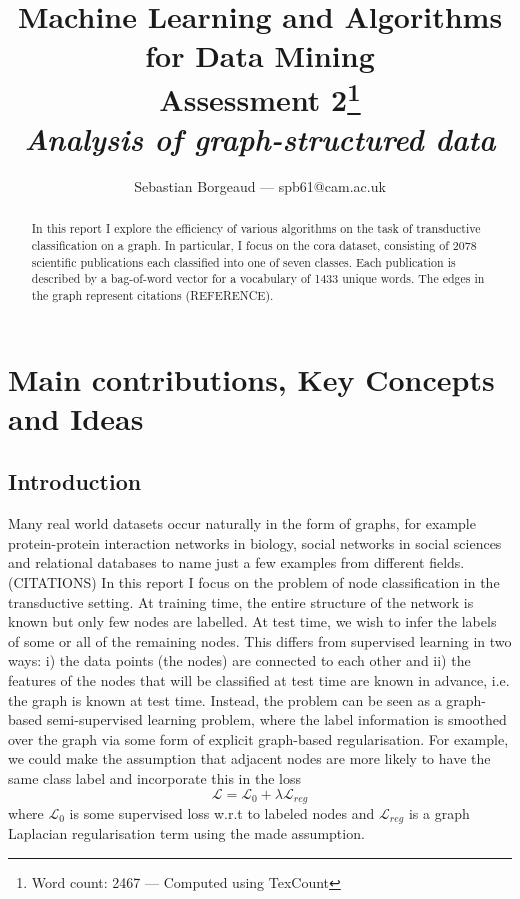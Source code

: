 \documentclass[12pt]{article}
\title{{\small{Machine Learning and Algorithms for Data Mining} \\
Assessment 2\footnote{Word count: 2467 --- Computed using TexCount}} \\
\textit{Analysis of graph-structured data}}
\author{Sebastian Borgeaud --- spb61@cam.ac.uk}
\theoremstyle{definition}
\begin{document}
\maketitle

\begin{abstract}
	In this report I explore the efficiency of various algorithms on the task of transductive classification on a graph. In particular, I focus on the cora dataset, consisting of 2078 scientific publications each classified into one of seven classes. Each publication is described by a bag-of-word vector for a vocabulary of 1433 unique words. The edges in the graph represent citations (REFERENCE).
	\end{abstract}

\section{Main contributions, Key Concepts and Ideas}
\subsection{Introduction}
Many real world datasets occur naturally in the form of graphs, for example protein-protein interaction networks in biology, social networks in social sciences and relational databases to name just a few examples from different fields. (CITATIONS) In this report I focus on the problem of node classification in the transductive setting. At training time, the entire structure of the network is known but only few nodes are labelled. At test time, we wish to infer the labels of some or all of the remaining nodes. This differs from supervised learning in two ways: i) the data points (the nodes) are connected to each other and ii) the features of the nodes that will be classified at test time are known in advance, i.e. the graph is known at test time. 
Instead, the problem can be seen as a graph-based semi-supervised learning problem, where the label information is smoothed over the graph via some form of explicit graph-based regularisation. For example, we could make the assumption that adjacent nodes are more likely to have the same class label and incorporate this in the loss
\begin{equation}
	\mathcal{L} = \mathcal{L}_0 + \lambda \mathcal{L}_{\mathit{reg}}
\end{equation}
where $\mathcal{L}_0$ is some supervised loss w.r.t to labeled nodes and $\mathcal{L}_{\mathit{reg}}$ is a graph Laplacian regularisation term using the made assumption.
\end{document}
